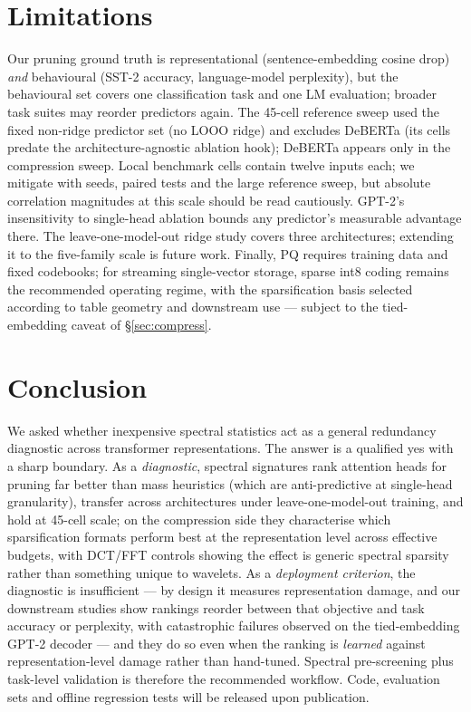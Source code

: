 \documentclass[conference]{IEEEtran}
\begin{document}


\section{Limitations}
Our pruning ground truth is representational (sentence-embedding cosine
drop) \emph{and} behavioural (SST-2 accuracy, language-model perplexity),
but the behavioural set covers one classification task and one LM
evaluation; broader task suites may reorder predictors again. The
45-cell reference sweep used the fixed non-ridge predictor set (no LOOO
ridge)
and excludes DeBERTa (its cells predate the architecture-agnostic
ablation hook); DeBERTa appears only in the compression sweep. Local
benchmark cells contain twelve inputs each; we mitigate with seeds,
paired tests and the large reference sweep, but absolute correlation
magnitudes at this scale should be read cautiously. GPT-2's insensitivity
to single-head ablation bounds any predictor's measurable advantage
there. The leave-one-model-out ridge study covers three architectures;
extending it to the five-family scale is future work. Finally, PQ
requires training data and fixed codebooks; for streaming single-vector
storage, sparse int8 coding remains the recommended operating regime,
with the sparsification basis selected according to table geometry and
downstream use --- subject to the tied-embedding caveat of
\S\ref{sec:compress}.

\section{Conclusion}
We asked whether inexpensive spectral statistics act as a general
redundancy diagnostic across transformer representations. The answer is
a qualified yes with a sharp boundary. As a \emph{diagnostic}, spectral
signatures rank attention heads for pruning far better than mass
heuristics (which are anti-predictive at single-head granularity),
transfer across architectures under leave-one-model-out training, and
hold at 45-cell scale; on the compression side they characterise which
sparsification formats perform best at the representation level across
effective budgets, with
DCT/FFT controls showing the effect is generic spectral sparsity rather
than something unique to wavelets. As a \emph{deployment criterion}, the
diagnostic is insufficient --- by design it measures representation
damage, and our downstream studies show rankings reorder between that
objective and task accuracy or perplexity, with catastrophic failures
observed on the tied-embedding GPT-2 decoder --- and they do so
even when the ranking is \emph{learned} against representation-level
damage rather than hand-tuned. Spectral
pre-screening plus task-level validation is therefore the recommended
workflow. Code, evaluation sets and offline regression tests will be
released upon publication.
\end{document}
